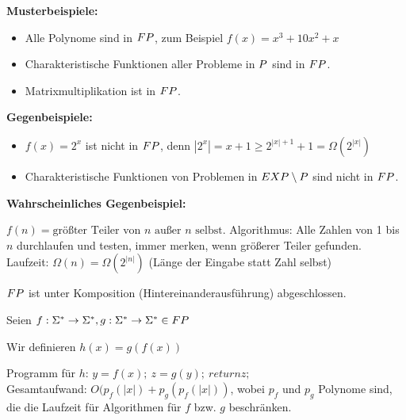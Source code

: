 \begin{beispiel}
    
    \textbf{Musterbeispiele:}

    \begin{itemize}
        \item Alle Polynome sind in $FP$, zum Beispiel $f(x) = x^3 + 10x^2 + x$
        \item Charakteristische Funktionen aller Probleme in $P$ sind in $FP$.
        \item Matrixmultiplikation ist in $FP$.
    \end{itemize}

    \textbf{Gegenbeispiele:}

    \begin{itemize}
        \item $f(x) = 2^x$ ist nicht in $FP$, denn $|2^x| = x + 1 \geq 2^{|x| + 1} +  1 = \Omega(2^{|x|})$
        \item Charakteristische Funktionen von Problemen in $EXP \setminus P$  sind nicht in $FP$.
    \end{itemize}

    \textbf{Wahrscheinliches Gegenbeispiel:}

    $f(n) = \text{größter Teiler von } n \text{ außer } n \text{ selbst.}$
    Algorithmus: Alle Zahlen von 1 bis $n$ durchlaufen und testen, immer merken, wenn größerer Teiler gefunden.\\
    Laufzeit: $\Omega(n) = \Omega(2^{|n|})$ (Länge der Eingabe statt Zahl selbst)

\end{beispiel}




\begin{satz}
    $FP$ ist unter Komposition (Hintereinanderausführung) abgeschlossen.\\
\end{satz}
\begin{beweis}
    
    Seien $ f: \Sigma^\ast \rightarrow \Sigma^\ast, g : \Sigma^\ast \rightarrow \Sigma^\ast \in FP $

    Wir definieren $h(x) = g(f(x))$

    Programm für $h$: $y = f(x);\ z = g(y);\ return z;$\\
    Gesamtaufwand: $O(p_f(|x|) + p_g(p_f(|x|))$, wobei $p_f$ und $p_g$ Polynome sind, die die Laufzeit für Algorithmen für $f$ bzw. $g$ beschränken.
\end{beweis}




